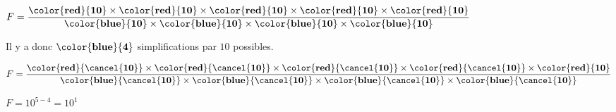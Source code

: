 \begin{enumerate}
            \medskip
            $F=\dfrac{\mathbf{\color{red}{10}} \times \mathbf{\color{red}{10}}\times \mathbf{\color{red}{10}}\times \mathbf{\color{red}{10}}\times \mathbf{\color{red}{10}}}{\mathbf{\color{blue}{10}} \times \mathbf{\color{blue}{10}}\times \mathbf{\color{blue}{10}}\times \mathbf{\color{blue}{10}}}$

            \medskip
            Il y a donc $\mathbf{\color{blue}{4}}$ simplifications par $10$ possibles.

            \medskip
            $F=\dfrac{\mathbf{\color{red}{\cancel{10}}} \times \mathbf{\color{red}{\cancel{10}}}\times \mathbf{\color{red}{\cancel{10}}}\times \mathbf{\color{red}{\cancel{10}}}\times\mathbf{\color{red}{10}}}{\mathbf{\color{blue}{\cancel{10}}} \times \mathbf{\color{blue}{\cancel{10}}}\times \mathbf{\color{blue}{\cancel{10}}}\times \mathbf{\color{blue}{\cancel{10}}}}$

            \medskip
            $F=10^{5-4}=10^{1}$
    \end{enumerate}

